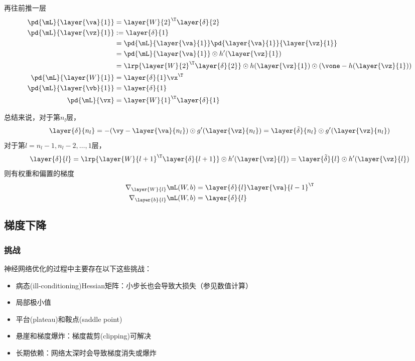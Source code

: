 再往前推一层
\[\begin{aligned}
\pd{\mL}{\layer{\va}{1}}
&=\layer{W}{2}^\T\layer{\delta}{2}\\
\pd{\mL}{\layer{\vz}{1}}
&:=\layer{\delta}{1}\\
&=\pd{\mL}{\layer{\va}{1}}\pd{\layer{\va}{1}}{\layer{\vz}{1}}\\
&=\pd{\mL}{\layer{\va}{1}}\odot h'(\layer{\vz}{1})\\
&=\lrp{\layer{W}{2}^\T\layer{\delta}{2}}\odot h(\layer{\vz}{1})\odot (\vone-h(\layer{\vz}{1}))\\
\pd{\mL}{\layer{W}{1}}&=\layer{\delta}{1}\vx^\T\\
\pd{\mL}{\layer{\vb}{1}}&=\layer{\delta}{1}\\
\pd{\mL}{\vx}&=\layer{W}{1}^\T\layer{\delta}{1}
\end{aligned}\]

总结来说，对于第$n_l$层，\textcolor{red}{
\[\layer{\delta}{n_l}=-(\vy-\layer{\va}{n_l})\odot g'(\layer{\vz}{n_l})=\layer{\tilde{\delta}}{n_l}\odot g'(\layer{\vz}{n_l})\]
}
对于第$l=n_l-1,n_l-2,\ldots,1$层，
\textcolor{red}{
\[\layer{\delta}{l}=\lrp{\layer{W}{l+1}^\T\layer{\delta}{l+1}}\odot h'(\layer{\vz}{l})=\layer{\tilde{\delta}}{l}\odot h'(\layer{\vz}{l})\]
}
则有权重和偏置的梯度\textcolor{red}{
\[\begin{aligned}
\nabla_{\layer{W}{l}}\mL(W,b)&=\layer{\delta}{l}\layer{\va}{l-1}^\T\\
\nabla_{\layer{b}{l}}\mL(W,b)&=\layer{\delta}{l}
\end{aligned}\]
}

\subsection{梯度下降}
\subsubsection{挑战}
神经网络优化的过程中主要存在以下这些挑战：
\begin{itemize}
    \item 病态(ill-conditioning)Hessian矩阵：小步长也会导致大损失（参见数值计算）
    \item 局部极小值
    \item 平台(plateau)和鞍点(saddle point)
    \item 悬崖和梯度爆炸：梯度裁剪(clipping)可解决
    \item 长期依赖：网络太深时会导致梯度消失或爆炸
\end{itemize}

